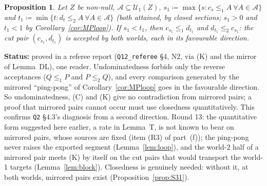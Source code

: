 \documentclass[11pt]{article}
\newtheorem{proposition}[theorem]{Proposition}
\theoremstyle{definition}
\theoremstyle{remark}
\newcommand{\src}[1]{\texttt{#1}}
\newcommand{\status}[1]{\par\smallskip\noindent\textbf{Status:} #1\par\smallskip}
\begin{document}
\begin{proposition}\label{prop:N2}
Let $Z$ be non-null, $\mathcal A\subseteq\mathcal U_1(Z)$, $s_1\coloneqq\max\{s:c_s\le_1A\ \forall A\in\mathcal A\}$ and $t_1\coloneqq\min\{t:d_t\le_2A\ \forall A\in\mathcal A\}$ (both attained, by closed sections; $s_1>0$ and $t_1<1$ by Corollary~\ref{cor:MPloop}). If $s_1<t_1$, then $c_{s_1}\le_1d_{t_1}$ and $d_{t_1}\le_2c_{s_1}$: the cut pair $(c_{s_1},d_{t_1})$ is accepted by both worlds, each in its favourable direction.
\end{proposition}
\status{proved in a referee report (\src{Q12\_referee} \S4, N2, via (K) and the mirror of Lemma~DL), one reader. Undominatedness forbids only the reverse acceptances ($Q\le_1P$ and $P\le_2Q$), and every comparison generated by the mirrored ``ping-pong'' of Corollary~\ref{cor:MPloop} goes in the favourable direction. So undominatedness, (C) and (K) give no contradiction from mirrored pairs; a proof that mirrored pairs cannot occur must use closedness quantitatively. This confirms \src{Q2} \S4.3's diagnosis from a second direction. Round 13: the quantitative form suggested here earlier, a rate in Lemma~T, is not known to bear on mirrored pairs, whose sources are fixed (item (R3) of part~(f)); the ping-pong never raises the exported segment (Lemma~\ref{lem:loop}), and the world-2 half of a mirrored pair meets (K) by itself on the cut pairs that would transport the world-1 targets (Lemma~\ref{lem:block}). Closedness is genuinely needed: without it, at both worlds, mirrored pairs exist (Proposition~\ref{prop:S31}).}
\end{document}
